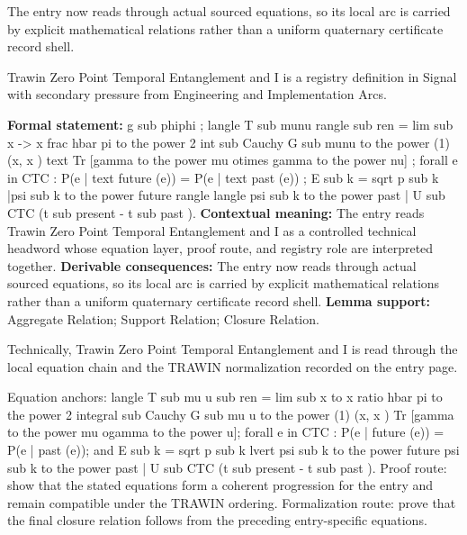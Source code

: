 The entry now reads through actual sourced equations, so its local arc is carried by explicit mathematical relations rather than a uniform quaternary certificate record shell.
\clearpage


\begingroup\small
{}
Trawin Zero Point Temporal Entanglement and I is a registry definition in Signal with secondary pressure from Engineering and Implementation Arcs.

\begingroup\footnotesize\setlength{\emergencystretch}{3em}\sloppy
\textbf{Formal statement:} g sub phiphi ; langle T sub munu rangle sub ren = lim sub x -> x frac hbar pi to the power 2 int sub Cauchy G sub munu to the power (1) (x, x ) text Tr [gamma to the power mu otimes gamma to the power nu] ; forall e in CTC : P(e | text future (e)) = P(e | text past (e)) ; E sub k = sqrt p sub k |psi sub k to the power future rangle langle psi sub k to the power past | U sub CTC (t sub present - t sub past ). \textbf{Contextual meaning:} The entry reads Trawin Zero Point Temporal Entanglement and I as a controlled technical headword whose equation layer, proof route, and registry role are interpreted together. \textbf{Derivable consequences:} The entry now reads through actual sourced equations, so its local arc is carried by explicit mathematical relations rather than a uniform quaternary certificate record shell. \textbf{Lemma support:} Aggregate Relation; Support Relation; Closure Relation.\par
\endgroup

Technically, Trawin Zero Point Temporal Entanglement and I is read through the local equation chain and the TRAWIN normalization recorded on the entry page.

Equation anchors: langle T sub mu u sub ren = lim sub x to x ratio hbar pi to the power 2 integral sub Cauchy G sub mu u to the power (1) (x, x ) Tr [gamma to the power mu ogamma to the power u]; forall e in CTC : P(e | future (e)) = P(e | past (e)); and E sub k = sqrt p sub k lvert psi sub k to the power future psi sub k to the power past | U sub CTC (t sub present - t sub past ). Proof route: show that the stated equations form a coherent progression for the entry and remain compatible under the TRAWIN ordering. Formalization route: prove that the final closure relation follows from the preceding entry-specific equations.

